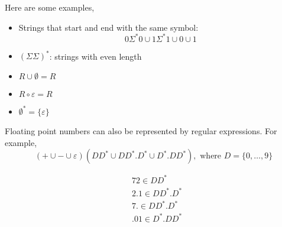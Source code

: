 \begin{eg}
Here are some examples,
\begin{itemize}
    \item 
    Strings that start and end with the same symbol:
    \begin{equation*}
        0 \Sigma^*0 \cup 1 \Sigma^*1\cup 0 \cup 1
    \end{equation*}
    \item $(\Sigma \Sigma)^*$: strings with even length
    \item $R\cup \emptyset=R$
    \item $R \circ \varepsilon=R$
    \item $\emptyset^*=\{\varepsilon\}$
\end{itemize}
\end{eg}

Floating point numbers can also be represented by regular expressions. For example,
\[
(+\cup-\cup\varepsilon)(DD^*\cup DD^*.D^*\cup D^*.DD^*), \text{ where } D = \{0, \ldots,9\}
\]

\begin{eg}
\begin{align*}
    & 72 \in DD^*\\
    & 2.1 \in DD^*.D^*\\
    &  7. \in DD^*.D^*\\
    & .01 \in D^*.DD^*
\end{align*}
\end{eg}

